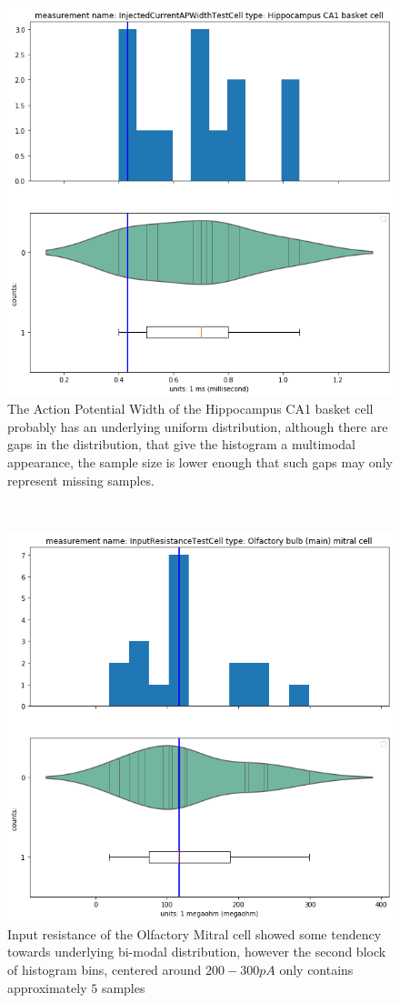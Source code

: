     \begin{center}
   \begin{figure} 
   \includegraphics[width=0.7\linewidth]{notebooks_converted/needata_thesis_files/needata_thesis_5_9}
   \caption{The Action Potential Width of the Hippocampus CA1 basket cell probably has an underlying uniform distribution, although there are gaps in the distribution, that give the histogram a multimodal appearance, the sample size is lower enough that such gaps may only represent missing samples.}
\end{figure}
\end{center}
    { \hspace*{\fill} \\}

\begin{center}
   \begin{figure}   
   \includegraphics[width=0.7\linewidth]{notebooks_converted/needata_thesis_files/needata_thesis_5_21}
         \caption{Input resistance of the Olfactory Mitral cell showed some tendency towards underlying bi-modal distribution, however the second block of histogram bins, centered around $200-300pA$ only contains approximately $5$ samples}
   \end{figure}
\end{center}
   
